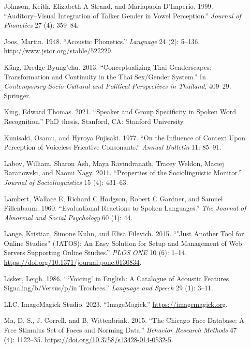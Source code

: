 \documentclass[
  letterpaper,
  DIV=11,
  numbers=noendperiod]{scrartcl}
\newlength{\cslhangindent}
\newenvironment{CSLReferences}[2] %
 {\begin{list}{}{%
  \setlength{\itemindent}{0pt}
  \setlength{\leftmargin}{0pt}
  \setlength{\parsep}{0pt}
  \ifodd #1
   \setlength{\leftmargin}{\cslhangindent}
   \setlength{\itemindent}{-1\cslhangindent}
  \fi
  \setlength{\itemsep}{#2\baselineskip}}}
 {\end{list}}
\begin{document}
\begin{CSLReferences}{1}{0}
Johnson, Keith, Elizabeth A Strand, and Mariapaola D'Imperio. 1999.
{``Auditory--Visual Integration of Talker Gender in Vowel Perception.''}
\emph{Journal of Phonetics} 27 (4): 359--84.

Joos, Martin. 1948. {``Acoustic Phonetics.''} \emph{Language} 24 (2):
5--136. \url{http://www.jstor.org/stable/522229}.

Käng, Dredge Byung'chu. 2013. {``Conceptualizing Thai Genderscapes:
Transformation and Continuity in the Thai Sex/Gender System.''} In
\emph{Contemporary Socio-Cultural and Political Perspectives in
Thailand}, 409--29. Springer.

King, Edward Thomas. 2021. {``Speaker and Group Specificity in Spoken
Word Recognition.''} PhD thesis, Stanford, CA: Stanford University.

Kunisaki, Osamu, and Hyroya Fujisaki. 1977. {``On the Influence of
Context Upon Perception of Voiceless Fricative Consonants.''}
\emph{Annual Bulletin} 11: 85--91.

Labov, William, Sharon Ash, Maya Ravindranath, Tracey Weldon, Maciej
Baranowski, and Naomi Nagy. 2011. {``Properties of the Sociolinguistic
Monitor.''} \emph{Journal of Sociolinguistics} 15 (4): 431--63.

Lambert, Wallace E, Richard C Hodgson, Robert C Gardner, and Samuel
Fillenbaum. 1960. {``Evaluational Reactions to Spoken Languages.''}
\emph{The Journal of Abnormal and Social Psychology} 60 (1): 44.

Lange, Kristian, Simone Kuhn, and Elisa Filevich. 2015. {``"Just Another
Tool for Online Studies'' (JATOS): An Easy Solution for Setup and
Management of Web Servers Supporting Online Studies.''} \emph{PLOS ONE}
10 (6): 1--14. \url{https://doi.org/10.1371/journal.pone.0130834}.

Lisker, Leigh. 1986. {``{`Voicing'} in English: A Catalogue of Acoustic
Features Signaling/b/Versus/p/in Trochees.''} \emph{Language and Speech}
29 (1): 3--11.

LLC, ImageMagick Studio. 2023. {``ImageMagick.''}
\url{https://imagemagick.org}.

Ma, D. S., J. Correll, and B. Wittenbrink. 2015. {``The Chicago Face
Database: A Free Stimulus Set of Faces and Norming Data.''}
\emph{Behavior Research Methods} 47 (4): 1122--35.
\url{https://doi.org/10.3758/s13428-014-0532-5}.


\end{CSLReferences}
\end{document}
